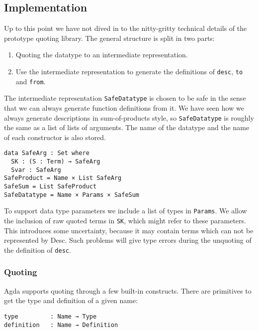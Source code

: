 \subsection{Implementation}\label{sec:prototype-implementation}

Up to this point we have not dived in to the nitty-gritty technical
details of the prototype quoting library.
The general structure is split in two parts:
\begin{enumerate}
\item Quoting the datatype to an intermediate representation.
\item Use the intermediate representation to generate the
  definitions of \texttt{desc}, \texttt{to} and \texttt{from}.
\end{enumerate}

The intermediate representation
\texttt{SafeDatatype} is chosen to
be safe in the sense that we can always generate function definitions
from it.
We have seen how we always generate descriptions in sum-of-products
style, so \texttt{SafeDatatype} is roughly the same as a list of lists
of arguments.
The name of the datatype and the name of each constructor is also
stored.

\begin{verbatim}
data SafeArg : Set where
  SK : (S : Term) → SafeArg
  Svar : SafeArg
SafeProduct = Name × List SafeArg
SafeSum = List SafeProduct
SafeDatatype = Name × Params × SafeSum
\end{verbatim}

To support data type parameters we include a list of types in
\texttt{Params}.
We allow the inclusion of raw quoted terms in \texttt{SK}, which might
refer to these parameters.
This introduces some uncertainty, because it may contain terms which
can not be represented by Desc.
Such problems will give type errors during the unquoting of the
definition of \texttt{desc}. 

\subsubsection[Quoting]{Quoting}

Agda supports quoting through a few built-in constructs.
There are primitives to get the type and definition of a given name:

\begin{verbatim}
type         : Name → Type
definition   : Name → Definition
\end{verbatim}

